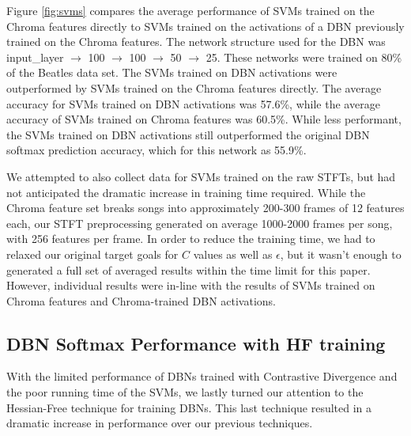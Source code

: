 \documentclass{article}
\begin{document}
Figure \ref{fig:svms} compares the average performance of SVMs trained on the
Chroma features directly to SVMs trained on the activations of a DBN previously
trained on the Chroma features. The network structure used for the DBN was
input\_layer $\rightarrow$ 100 $\rightarrow$ 100 $\rightarrow$ 50 $\rightarrow$
25. These networks were trained on 80\% of the Beatles data set. The SVMs
trained on DBN activations were outperformed by SVMs trained on the Chroma
features directly.  The average accuracy for SVMs trained on DBN activations
was 57.6\%, while the average accuracy of SVMs trained on Chroma features was
60.5\%. While less performant, the SVMs trained on DBN activations still
outperformed the original DBN softmax prediction accuracy, which for this
network as 55.9\%.

We attempted to also collect data for SVMs trained on the raw STFTs, but had
not anticipated the dramatic increase in training time required. While the
Chroma feature set breaks songs into approximately 200-300 frames of 12
features each, our STFT preprocessing generated on average 1000-2000
frames per song, with 256 features per frame. In order to reduce the training
time, we had to relaxed our original target goals for $C$ values as well as
$\epsilon$, but it wasn't enough to generated a full set of averaged results
within the time limit for this paper. However, individual results were in-line
with the results of SVMs trained on Chroma features and Chroma-trained DBN
activations.


\subsection{DBN Softmax Performance with HF training}

With the limited performance of DBNs trained with Contrastive Divergence and
the poor running time of the SVMs, we lastly turned our attention to the
Hessian-Free technique for training DBNs. This last technique resulted in a
dramatic increase in performance over our previous techniques.
\end{document}
